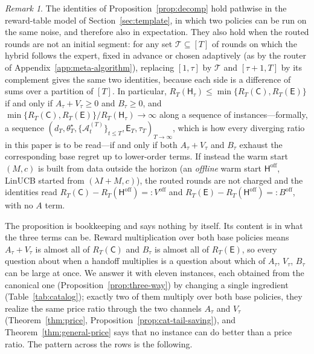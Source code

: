 \documentclass{article}
\theoremstyle{definition}
\theoremstyle{remark}
\newtheorem{remark}{Remark}
\theoremstyle{remark}
\newcommand{\Cold}{\mathsf{C}}
\newcommand{\Exp}{\mathsf{E}}
\newcommand{\Hyb}{\mathsf{H}}
\begin{document}
\begin{remark}
The identities of Proposition~\ref{prop:decomp} hold pathwise in the
reward-table model of Section~\ref{sec:template}, in which two policies can
be run on the same noise, and therefore also in expectation. They also hold
when the routed rounds are not an initial segment: for any set
$\mathcal T\subseteq[T]$ of rounds on which the hybrid follows the expert,
fixed in advance or chosen adaptively (as by the router of
Appendix~\ref{app:meta-algorithm}), replacing $[1,\tau]$ by $\mathcal T$ and
$[\tau+1,T]$ by its complement gives the same two identities, because each
side is a difference of sums over a partition of $[T]$. In particular,
$R_T(\Hyb_\tau)\le\min\{R_T(\Cold),R_T(\Exp)\}$ if and only if
$A_\tau+V_\tau\ge0$ and $B_\tau\ge0$, and
$\min\{R_T(\Cold),R_T(\Exp)\}/R_T(\Hyb_\tau)\to\infty$ along a sequence of
instances---formally, a sequence
$(d_T,\theta^\star_T,\{\mathcal A^{(T)}_t\}_{t\le T},\Exp_T,\tau_T)_{T\to\infty}$,
which is how every diverging ratio in this paper is to be read---if and only
if both $A_\tau+V_\tau$ and $B_\tau$ exhaust the corresponding base regret up
to lower-order terms. If instead the warm start
$(M,c)$ is built from data outside the horizon (an \emph{offline} warm start
$\Hyb^{\mathrm{off}}$, LinUCB started from $(\lambda I+M,c)$), the routed
rounds are not charged and the identities read
$R_T(\Cold)-R_T(\Hyb^{\mathrm{off}})=:V^{\mathrm{off}}$ and
$R_T(\Exp)-R_T(\Hyb^{\mathrm{off}})=:B^{\mathrm{off}}$, with no $A$ term.
\end{remark}

The proposition is bookkeeping and says nothing by itself. Its content is in
what the three terms can be. Reward multiplication over both base policies
means $A_\tau+V_\tau$ is almost all of $R_T(\Cold)$ and $B_\tau$ is almost all
of $R_T(\Exp)$, so every question about when a handoff multiplies is a
question about which of $A_\tau$, $V_\tau$, $B_\tau$ can be large at once. We
answer it with eleven instances, each obtained from the canonical one
(Proposition~\ref{prop:three-way}) by changing a single ingredient
(Table~\ref{tab:catalog}); exactly two of them multiply over both base
policies, they realize the same price ratio through the two channels
$A_\tau$ and $V_\tau$ (Theorem~\ref{thm:price},
Proposition~\ref{prop:cat-tail-saving}), and Theorem~\ref{thm:general-price}
says that no instance can do better than a price ratio. The pattern across
the rows is the following.


\begin{center}
\end{center}
\end{document}

